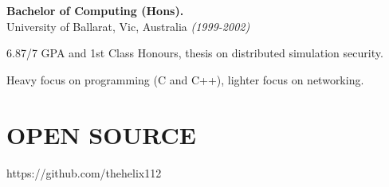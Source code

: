 \documentclass[margin]{res}
\begin{document}
\begin{resume}
{\bf Bachelor of Computing (Hons).} \\
University of Ballarat, Vic, Australia {\em (1999-2002)}
\begin{list}{}{\leftmargin=1.5em \topsep=5pt \partopsep=0pt \parsep=2.5pt}
  \item 6.87/7 GPA and 1st Class Honours, thesis on distributed simulation security.
  \item Heavy focus on programming (C and C++), lighter focus on networking.
\end{list}


\section{OPEN SOURCE}
https://github.com/thehelix112









\end{resume}
\end{document}
